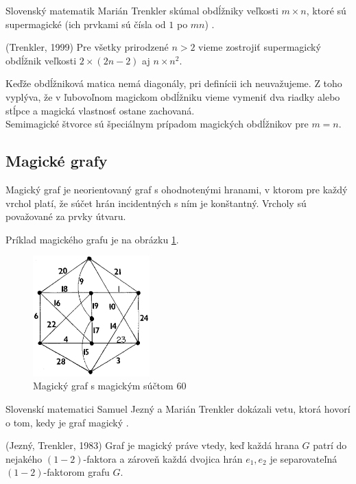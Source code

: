 Slovenský matematik Marián Trenkler skúmal obdĺžniky veľkosti $m \times n$, ktoré sú supermagické (ich prvkami sú čísla od $1$ po $mn$) \cite{rectangles}.

\begin{theorem} (Trenkler, 1999) Pre všetky prirodzené $n > 2$ vieme zostrojiť supermagický obdĺžnik veľkosti $2 \times (2n - 2)$ aj $n \times n^2$.
\end{theorem}

Keďže obdĺžniková matica nemá diagonály, pri definícii ich neuvažujeme. Z toho vyplýva, že v ľubovoľnom magickom obdĺžniku vieme vymeniť dva riadky alebo stĺpce a magická vlastnosť ostane zachovaná. \\

Semimagické štvorce sú špeciálnym prípadom magických obdĺžnikov pre $m = n$. \\

\subsection{Magické grafy}
\begin{definition} Magický graf je neorientovaný graf s ohodnotenými hranami, v ktorom pre každý vrchol platí, že súčet hrán incidentných s ním je konštantný. Vrcholy sú považované za prvky útvaru.
\end{definition}

Príklad magického grafu je na obrázku \ref{obr:fig_magic_graph}.

\begin{figure}[H]
\centerline{\includegraphics[width=0.4\textwidth]{images/magic_graph}}
\caption[Magický graf]{Magický graf s magickým súčtom 60 \cite{regular}}
\label{obr:fig_magic_graph}
\end{figure}

Slovenskí matematici Samuel Jezný a Marián Trenkler dokázali vetu, ktorá hovorí o tom, kedy je graf magický \cite{graphs}.

\begin{theorem} (Jezný, Trenkler, 1983) Graf je magický práve vtedy, keď každá hrana $G$ patrí do nejakého $(1-2)$-faktora a zároveň každá dvojica hrán $e_1, e_2$ je separovateľná $(1-2)$-faktorom grafu $G$.
\end{theorem}

